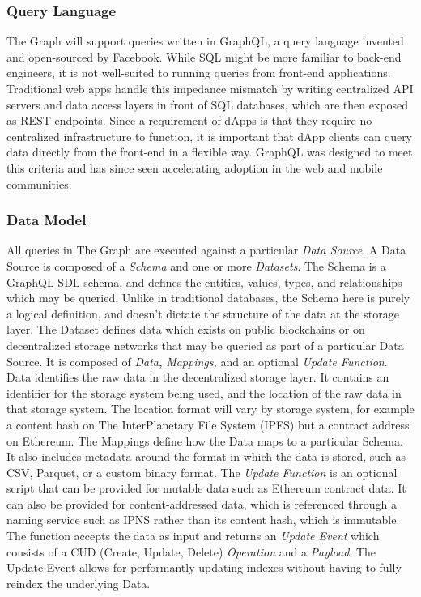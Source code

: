 \documentclass[12pt]{article}
\begin{document}
\subsubsection*{Query Language}
The Graph will support queries written in GraphQL, a query language invented and open-sourced by Facebook. While SQL might be more familiar to back-end engineers, it is not well-suited to running queries from front-end applications. Traditional web apps handle this impedance mismatch by writing centralized API servers and data access layers in front of SQL databases, which are then exposed as REST endpoints. Since a requirement of dApps is that they require no centralized infrastructure to function, it is important that dApp clients can query data directly from the front-end in a flexible way. GraphQL was designed to meet this criteria and has since seen accelerating adoption in the web and mobile communities.
\subsubsection*{Data Model}
All queries in The Graph are executed against a particular \textit{Data Source}. A Data Source is composed of a \textit{Schema} and one or more \textit{Datasets}.
\newline
\newline
The Schema is a GraphQL SDL schema, and defines the entities, values, types, and relationships which may be queried. Unlike in traditional databases, the Schema here is purely a logical definition, and doesn't dictate the structure of the data at the storage layer.
\newline
\newline
The Dataset defines data which exists on public blockchains or on decentralized storage networks that may be queried as part of a particular Data Source. It is composed of \textit{Data}\textbf{,} \textit{Mappings,} and an optional \textit{Update Function}.
\newline
\newline
Data identifies the raw data in the decentralized storage layer. It contains an identifier for the storage system being used, and the location of the raw data in that storage system. The location format will vary by storage system, for example a content hash on The InterPlanetary File System (IPFS) but a contract address on Ethereum.
The Mappings define how the Data maps to a particular Schema. It also includes metadata around the format in which the data is stored, such as CSV, Parquet, or a custom binary format.
\newline
\newline
The \textit{Update Function} is an optional script that can be provided for mutable data such as Ethereum contract data. It can also be provided for content-addressed data, which is referenced through a naming service such as IPNS rather than its content hash, which is immutable. The function accepts the data as input and returns an \textit{Update Event} which consists of a CUD (Create, Update, Delete) \textit{Operation} and a \textit{Payload}. The Update Event allows for performantly updating indexes without having to fully reindex the underlying Data.
\end{document}
